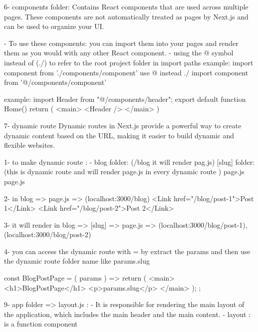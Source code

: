 6- components folder: Contains React components that are used across multiple pages.
    These components are not automatically treated as pages by Next.js and can be used to organize your UI.

    - To use these components: 
        you can import them into your pages and render them as you would with any other React component.
    - using the @ symbol  instead of (./) to refer to the root project folder in import paths
        example: 
                import component from './components/component'
            use @ instead ./
                import component from '@/components/component'

        example: 
            import Header from "@/components/header";
            export default function Home() {
                        return (
                            <main>
                            <Header />
                            </main>
                        )}

7- dynamic route
        Dynamic routes in Next.js provide a powerful way to create dynamic content based on the URL,
        making it easier to build dynamic and flexible websites.

       1- to make dynamic route :
            - blog folder:   (/blog it will render pag.js)
                    [slug] folder: (this is dynamic route and will render page.js in every dynamic route )
                            page.js 
                    page.js

        2-    in blog => page.js =>  (localhost:3000/blog)
                        <Link href="/blog/post-1">Post 1</Link>
                        <Link href="/blog/post-2">Post 2</Link>
            
        3-    it will render in blog => [slug] => page.js => (localhost:3000/blog/post-1), (localhost:3000/blog/post-2)

        4- you can access the dynamic route with 
            = by extract the {params} and then use the dynamic route folder name 
                like {params.slug}
                
                const BlogPostPage = ({ params }) => {
                            return (
                                <main>
                                <h1>BlogPostPage</h1>
                                <p>{params.slug}</p>
                                </main>
                            );
                            };


9- app folder => layout.js : 
        - It is responsible for rendering the main layout of the application, which includes the main header and the main content.
        - layout : is a function component

